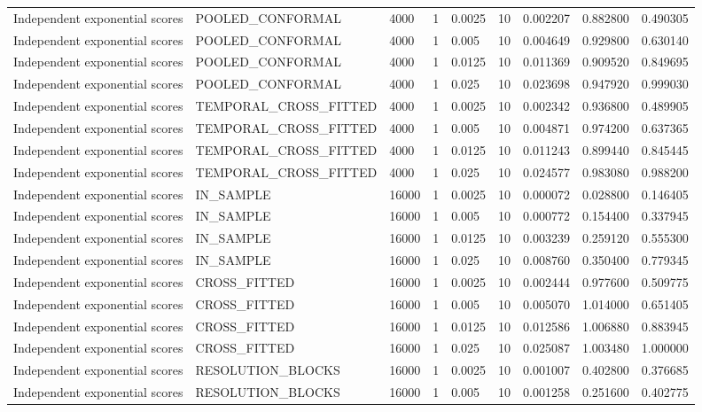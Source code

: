 \begin{tabular}{lllllllll}
Independent exponential scores & POOLED\_CONFORMAL & 4000 & 1 & 0.0025 & 10 & 0.002207 & 0.882800 & 0.490305 \\
Independent exponential scores & POOLED\_CONFORMAL & 4000 & 1 & 0.005 & 10 & 0.004649 & 0.929800 & 0.630140 \\
Independent exponential scores & POOLED\_CONFORMAL & 4000 & 1 & 0.0125 & 10 & 0.011369 & 0.909520 & 0.849695 \\
Independent exponential scores & POOLED\_CONFORMAL & 4000 & 1 & 0.025 & 10 & 0.023698 & 0.947920 & 0.999030 \\
Independent exponential scores & TEMPORAL\_CROSS\_FITTED & 4000 & 1 & 0.0025 & 10 & 0.002342 & 0.936800 & 0.489905 \\
Independent exponential scores & TEMPORAL\_CROSS\_FITTED & 4000 & 1 & 0.005 & 10 & 0.004871 & 0.974200 & 0.637365 \\
Independent exponential scores & TEMPORAL\_CROSS\_FITTED & 4000 & 1 & 0.0125 & 10 & 0.011243 & 0.899440 & 0.845445 \\
Independent exponential scores & TEMPORAL\_CROSS\_FITTED & 4000 & 1 & 0.025 & 10 & 0.024577 & 0.983080 & 0.988200 \\
Independent exponential scores & IN\_SAMPLE & 16000 & 1 & 0.0025 & 10 & 0.000072 & 0.028800 & 0.146405 \\
Independent exponential scores & IN\_SAMPLE & 16000 & 1 & 0.005 & 10 & 0.000772 & 0.154400 & 0.337945 \\
Independent exponential scores & IN\_SAMPLE & 16000 & 1 & 0.0125 & 10 & 0.003239 & 0.259120 & 0.555300 \\
Independent exponential scores & IN\_SAMPLE & 16000 & 1 & 0.025 & 10 & 0.008760 & 0.350400 & 0.779345 \\
Independent exponential scores & CROSS\_FITTED & 16000 & 1 & 0.0025 & 10 & 0.002444 & 0.977600 & 0.509775 \\
Independent exponential scores & CROSS\_FITTED & 16000 & 1 & 0.005 & 10 & 0.005070 & 1.014000 & 0.651405 \\
Independent exponential scores & CROSS\_FITTED & 16000 & 1 & 0.0125 & 10 & 0.012586 & 1.006880 & 0.883945 \\
Independent exponential scores & CROSS\_FITTED & 16000 & 1 & 0.025 & 10 & 0.025087 & 1.003480 & 1.000000 \\
Independent exponential scores & RESOLUTION\_BLOCKS & 16000 & 1 & 0.0025 & 10 & 0.001007 & 0.402800 & 0.376685 \\
Independent exponential scores & RESOLUTION\_BLOCKS & 16000 & 1 & 0.005 & 10 & 0.001258 & 0.251600 & 0.402775 \\

\end{tabular}
